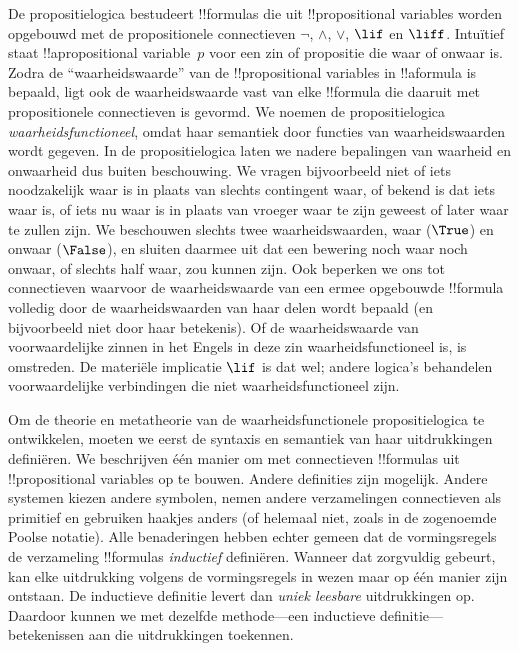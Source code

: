 \documentclass[../../../include/open-logic-section]{subfiles}
\begin{document}


De propositielogica bestudeert !!{formula}s die uit
!!{propositional variable}s worden opgebouwd met de propositionele
connectieven $\lnot$, $\land$, $\lor$, $\lif$ en $\liff$. Intuïtief
staat !!a{propositional variable}~$p$ voor een zin of propositie die
waar of onwaar is. Zodra de ``waarheidswaarde'' van de
!!{propositional variable}s in !!a{formula} is bepaald, ligt ook de
waarheidswaarde vast van elke !!{formula} die daaruit met propositionele
connectieven is gevormd. We noemen de propositielogica
\emph{waarheidsfunctioneel}, omdat haar semantiek door functies van
waarheidswaarden wordt gegeven. In de propositielogica laten we nadere
bepalingen van waarheid en onwaarheid dus buiten beschouwing. We vragen
bijvoorbeeld niet of iets noodzakelijk waar is in plaats van slechts
contingent waar, of bekend is dat iets waar is, of iets nu waar is in
plaats van vroeger waar te zijn geweest of later waar te zullen zijn.
We beschouwen slechts twee waarheidswaarden, waar ($\True$) en onwaar
($\False$), en sluiten daarmee uit dat een bewering noch waar noch
onwaar, of slechts half waar, zou kunnen zijn. Ook beperken we ons tot
connectieven waarvoor de waarheidswaarde van een ermee opgebouwde
!!{formula} volledig door de waarheidswaarden van haar delen wordt
bepaald (en bijvoorbeeld niet door haar betekenis). Of de
waarheidswaarde van voorwaardelijke zinnen in het Engels in deze
zin waarheidsfunctioneel is, is omstreden. De materiële implicatie
$\lif$ is dat wel; andere logica's behandelen voorwaardelijke
verbindingen die niet waarheidsfunctioneel zijn.

Om de theorie en metatheorie van de waarheidsfunctionele
propositielogica te ontwikkelen, moeten we eerst de syntaxis en
semantiek van haar uitdrukkingen definiëren. We beschrijven één manier
om met connectieven !!{formula}s uit !!{propositional variable}s op te
bouwen. Andere definities zijn mogelijk. Andere systemen kiezen andere
symbolen, nemen andere verzamelingen connectieven als primitief en
gebruiken haakjes anders (of helemaal niet, zoals in de zogenoemde
Poolse notatie). Alle benaderingen hebben echter gemeen dat de
vormingsregels de verzameling !!{formula}s \emph{inductief} definiëren.
Wanneer dat zorgvuldig gebeurt, kan elke uitdrukking volgens de
vormingsregels in wezen maar op één manier zijn ontstaan. De inductieve
definitie levert dan \emph{uniek leesbare} uitdrukkingen op. Daardoor
kunnen we met dezelfde methode---een inductieve definitie---betekenissen
aan die uitdrukkingen toekennen.
\end{document}
